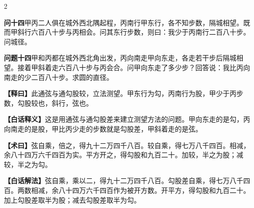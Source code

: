\documentclass[11pt,a4paper]{article}
\newcommand{\WenQuestion}[1]{\textbf{\textcolor{classicalcolor}{#1}}}
\newcommand{\BaiQuestion}[1]{\textbf{\textcolor{moderncolor}{#1}}}
\newcommand{\WenExplain}{\textcolor{classicalcolor}{\textbf{【释曰】}}}
\newcommand{\BaiExplain}{\textcolor{moderncolor}{\textbf{【白话释义】}}}
\newcommand{\WenMethod}{\textcolor{classicalcolor}{\textbf{【术曰】}}}
\newcommand{\BaiMethod}{\textcolor{moderncolor}{\textbf{【白话解法】}}}
\begin{document}
\vspace{0.5em}

\begin{paracol}{2}

\switchcolumn*
\begin{tcolorbox}[colback=red!3,colframe=red!30!black,boxrule=0.3pt]
\WenQuestion{问十四}\quad 甲丙二人俱在城外西北隅起程，丙南行甲东行，各不知步数，隔城相望。既而甲斜行六百八十步与丙相会。问其东行步数，则曰：我少于丙南行二百八十步。问城径。
\end{tcolorbox}
\switchcolumn
\begin{tcolorbox}[colback=blue!3,colframe=blue!30!black,boxrule=0.3pt]
\BaiQuestion{问题十四}\quad 甲和丙都在城外西北角出发，丙向南走甲向东走，各走若干步后隔城相望。接着甲斜着走六百八十步与丙会合。问甲向东走了多少步？回答说：我比丙向南走的少二百八十步。求圆的直径。
\end{tcolorbox}

\switchcolumn*
\begin{tcolorbox}[colback=red!5,colframe=red!30!black,boxrule=0.3pt]
\WenExplain\quad 此通弦与通勾股较，立法测望。甲东行为勾，丙南行为股，甲少于丙步数，勾股较也，斜行，弦也。
\end{tcolorbox}
\switchcolumn
\begin{tcolorbox}[colback=blue!5,colframe=blue!30!black,boxrule=0.3pt]
\BaiExplain\quad 这是用通弦与通勾股差来建立测望方法的问题。甲向东走的是勾，丙向南走的是股，甲比丙少走的步数就是勾股差，甲斜着走的是弦。
\end{tcolorbox}

\switchcolumn*
\begin{tcolorbox}[colback=red!5,colframe=red!40!black,boxrule=0.3pt]
\WenMethod\quad 弦自乘，倍之，得九十二万四千八百。较自乘，得七万八千四百。相减，余八十四万六千四百为实。平方开之，得勾股和九百二十。加较，半之为股；减较，半之为勾。
\end{tcolorbox}
\switchcolumn
\begin{tcolorbox}[colback=blue!5,colframe=blue!40!black,boxrule=0.3pt]
\BaiMethod\quad 弦自乘，乘以二，得九十二万四千八百。勾股差自乘，得七万八千四百。两数相减，余八十四万六千四百作为被开方数。开平方，得勾股和九百二十。加上勾股差取半为股；减去勾股差取半为勾。
\end{tcolorbox}

\end{paracol}

\vspace{0.5em}
\end{document}
